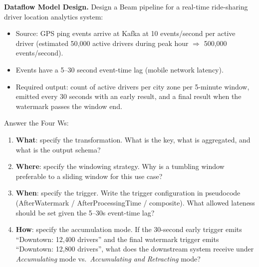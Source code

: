 \ap \textbf{Dataflow Model Design.}
Design a Beam pipeline for a real-time ride-sharing driver location analytics
system:
\begin{itemize}
  \item Source: GPS ping events arrive at Kafka at 10 events/second
        per active driver (estimated 50{,}000 active drivers during
        peak hour $\Rightarrow$ 500{,}000 events/second).
  \item Events have a 5--30 second event-time lag (mobile network latency).
  \item Required output: count of active drivers per city zone per
        5-minute window, emitted every 30 seconds with an early result,
        and a final result when the watermark passes the window end.
\end{itemize}
Answer the Four Ws:
\begin{enumerate}[label=(\alph*)]
  \item \textbf{What}: specify the transformation. What is the key,
        what is aggregated, and what is the output schema?
  \item \textbf{Where}: specify the windowing strategy. Why is a tumbling
        window preferable to a sliding window for this use case?
  \item \textbf{When}: specify the trigger. Write the trigger configuration
        in pseudocode (AfterWatermark / AfterProcessingTime / composite).
        What allowed lateness should be set given the 5--30s event-time lag?
  \item \textbf{How}: specify the accumulation mode. If the 30-second
        early trigger emits ``Downtown: 12{,}400 drivers'' and the final
        watermark trigger emits ``Downtown: 12{,}800 drivers'', what does the
        downstream system receive under \emph{Accumulating} mode vs.\
        \emph{Accumulating and Retracting} mode?
\end{enumerate}

